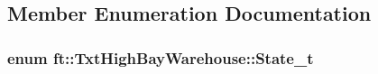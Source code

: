 \subsection{Member Enumeration Documentation}
\subsubsection[{\texorpdfstring{State\+\_\+t}{State_t}}]{\setlength{\rightskip}{0pt plus 5cm}enum {\bf ft\+::\+Txt\+High\+Bay\+Warehouse\+::\+State\+\_\+t}}\hypertarget{classft_1_1_txt_high_bay_warehouse_aa35f35b5549913d838cb6070bb28da30}{}\label{classft_1_1_txt_high_bay_warehouse_aa35f35b5549913d838cb6070bb28da30}
